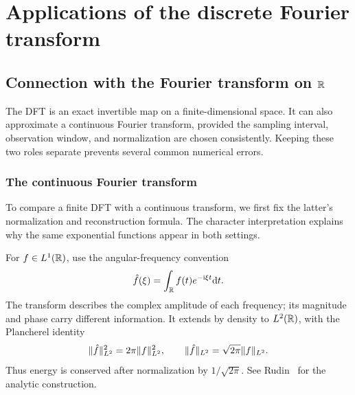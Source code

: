 \chapter{Applications of the discrete Fourier transform}
\label{chap-applications-tfd}

\section{Connection with the Fourier transform on \texorpdfstring{$\mathbb{R}$}{R}}
\label{sect1-link-trans-fourier-R}
The DFT is an exact invertible map on a finite-dimensional space. It can also
approximate a continuous Fourier transform, provided the sampling interval,
observation window, and normalization are chosen consistently. Keeping these
two roles separate prevents several common numerical errors.

\subsection{The continuous Fourier transform}
\label{sect2-transforme-fourier-continue}

To compare a finite DFT with a continuous transform, we first fix the
latter's normalization and reconstruction formula. The character
interpretation explains why the same exponential functions appear in both
settings.

For $f\in L^1(\mathbb{R})$, use the angular-frequency convention
\begin{equation}
\label{eq-transforme-fourier-R}
 \hat{f}(\xi)=\int_{\mathbb{R}}f(t)e^{-\mathrm{i}\xi t}\mathrm{d} t.
\end{equation}
The transform describes the complex amplitude of each frequency; its
magnitude and phase carry different information. It extends by density to
$L^2(\mathbb{R})$, with the Plancherel identity
\[
 \|\hat{f}\|_{L^2}^2=2\pi\|f\|_{L^2}^2,
 \qquad \|\hat{f}\|_{L^2}=\sqrt{2\pi}\|f\|_{L^2}.
\]
Thus energy is conserved after normalization by $1/\sqrt{2\pi}$.
See Rudin~\cite{rudin} for the analytic construction.


